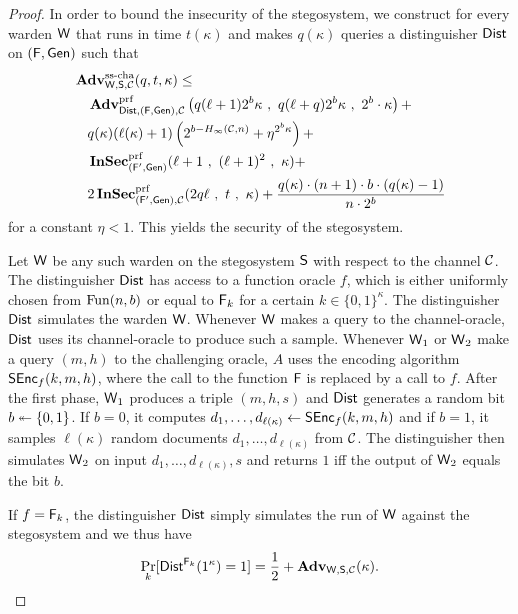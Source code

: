  
 
\begin{proof}
  In order to bound the insecurity of the stegosystem, we construct for
  every warden $\operatorname{\mathsf{W}}$ that runs in time $t(\kappa)$ and makes
  $q(\kappa)$ queries a distinguisher $\operatorname{\mathsf{Dist}}$ on  $(\operatorname{\mathsf{F}},\operatorname{\mathsf{Gen}})$
  such that
  \begin{align*}
    & \Adv^{\sscha}_{\Ward,\Steg,\chan}(q,t,\kappa)\leq\\
    &\quad
    \Adv^{\prf}_{\Dist,(\algf,\Gen),\chan}\left(q(\ell+1)2^{b}\kappa\ ,\
        q(\ell+q)2^{b}\kappa\ ,\ 2^{b}\cdot \kappa\right)+\\
      &\quad q(\kappa)(\ell(\kappa)+1)\left(2^{b-\minent(\chan,n)}+\eta^{2^{b}\kappa}\right)+\\
      &\quad \InSec^{\prf}_{(\algf',\Gen)}(\ell+1\ ,\ (\ell+1)^{2}\ ,\ \kappa)  +\\
      &\quad 2\InSec^{\prf}_{(\algf',\Gen),\chan}(2q\ell\ ,\ t\ ,\ \kappa) +
      \frac{q(\kappa)\cdot (n+1)\cdot b\cdot 
        (q(\kappa)-1)}{n\cdot 2^{b}}
  \end{align*}
for a constant $\eta < 1$. This yields the security of the stegosystem.

 Let $\operatorname{\mathsf{W}}$ be any such
  warden on the stegosystem $\operatorname{\mathsf{S}}$ with respect to the channel
  $\mathcal{C}$. The distinguisher $\operatorname{\mathsf{Dist}}$ has access to a function oracle $f$,
  which is either uniformly chosen from $\operatorname{Fun}(n,b)$ or
  equal to $\operatorname{\mathsf{F}}_{k}$ for a certain $k\in \{0,1\}^{\kappa}$. The
  distinguisher $\operatorname{\mathsf{Dist}}$ simulates the warden $\operatorname{\mathsf{W}}$. Whenever $\operatorname{\mathsf{W}}$
  makes a query to
  the channel-oracle, $\operatorname{\mathsf{Dist}}$ uses its channel-oracle to produce such a
  sample. Whenever $\operatorname{\mathsf{W}}_{1}$ or $\operatorname{\mathsf{W}}_{2}$ make a query $(m,h)$ to the challenging oracle,
  $A$ uses the encoding algorithm $\operatorname{\mathsf{SEnc}}_{f}(k,m,h)$, where the call to
  the function $\operatorname{\mathsf{F}}$ is replaced by a call to $f$. After the first
  phase, $\operatorname{\mathsf{W}}_{1}$ produces a triple $(m,h,s)$ and $\operatorname{\mathsf{Dist}}$
  generates a random bit $b\twoheadleftarrow \{0,1\}$. If $b=0$, it computes
  $d_{1},\ldots,d_{\ell(\kappa)} \gets \operatorname{\mathsf{SEnc}}_{f}(k,m,h)$ and if $b=1$,
  it samples $\ell(\kappa)$ random documents
  $d_{1},\ldots,d_{\ell(\kappa)}$ from $\mathcal{C}$. The distinguisher then simulates
  $\operatorname{\mathsf{W}}_{2}$ on input $d_{1},\ldots,d_{\ell(\kappa)},s$ and returns $1$
  iff the output of $\operatorname{\mathsf{W}}_{2}$ equals the bit $b$.

  If $f=\operatorname{\mathsf{F}}_{k}$, the distinguisher $\operatorname{\mathsf{Dist}}$
  simply simulates the run of $\operatorname{\mathsf{W}}$ against the stegosystem and we
  thus have
  \begin{align*}
    \Pr_{k}[\operatorname{\mathsf{Dist}}^{\operatorname{\mathsf{F}}_{k}}(1^{\kappa})=1]=\frac{1}{2}+\operatorname{\mathbf{Adv}}_{\operatorname{\mathsf{W}},\operatorname{\mathsf{S}},\mathcal{C}}(\kappa).
  \end{align*}


\end{proof}
